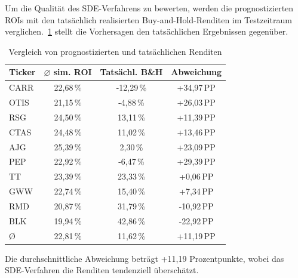 Um die Qualität des SDE-Verfahrens zu bewerten, werden die prognostizierten ROIs mit den tatsächlich realisierten Buy-and-Hold-Renditen im Testzeitraum verglichen.~\cref{tab:sde_validation} stellt die Vorhersagen den tatsächlichen Ergebnissen gegenüber.

\begin{table}[htbp]
    \centering
    \begin{tabular}{l c c c}
        \toprule
        Ticker & $\varnothing$ sim. ROI & Tatsächl. B\&H & Abweichung \\
        \midrule
        CARR   & 22,68\,\%              & -12,29\,\%     & +34,97\,PP \\
        OTIS   & 21,15\,\%              & -4,88\,\%      & +26,03\,PP \\
        RSG    & 24,50\,\%              & 13,11\,\%      & +11,39\,PP \\
        CTAS   & 24,48\,\%              & 11,02\,\%      & +13,46\,PP \\
        AJG    & 25,39\,\%              & 2,30\,\%       & +23,09\,PP \\
        PEP    & 22,92\,\%              & -6,47\,\%      & +29,39\,PP \\
        TT     & 23,39\,\%              & 23,33\,\%      & +0,06\,PP  \\
        GWW    & 22,74\,\%              & 15,40\,\%      & +7,34\,PP  \\
        RMD    & 20,87\,\%              & 31,79\,\%      & -10,92\,PP \\
        BLK    & 19,94\,\%              & 42,86\,\%      & -22,92\,PP \\
        \midrule
        \O     & 22,81\,\%              & 11,62\,\%      & +11,19\,PP \\
        \bottomrule
    \end{tabular}
    \caption{Vergleich von prognostizierten und tatsächlichen Renditen}\label{tab:sde_validation}
\end{table}

Die durchschnittliche Abweichung beträgt +11,19 Prozentpunkte, wobei das SDE-Verfahren die Renditen tendenziell überschätzt.

